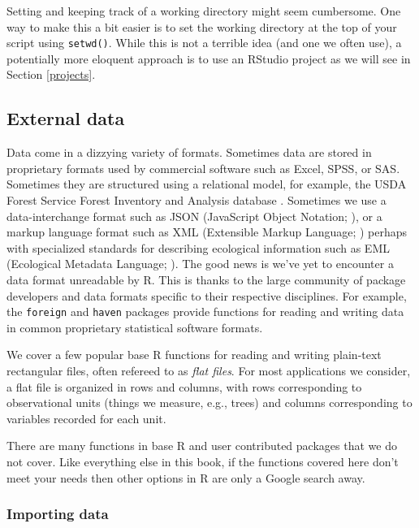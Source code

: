 \documentclass[
  11pt,
]{krantz}
\theoremstyle{definition}
\theoremstyle{definition}
\theoremstyle{definition}
\theoremstyle{definition}
\theoremstyle{remark}
\begin{document}
Setting and keeping track of a working directory might seem cumbersome. One way to make this a bit easier is to set the working directory at the top of your script using \texttt{setwd()}. While this is not a terrible idea (and one we often use), a potentially more eloquent approach is to use an RStudio project as we will see in Section \ref{projects}.

\hypertarget{readWrite}{%
\subsection{External data}\label{readWrite}}

Data come in a dizzying variety of formats. Sometimes data are stored in proprietary formats used by commercial software such as Excel, SPSS, or SAS. Sometimes they are structured using a relational model, for example, the USDA Forest Service Forest Inventory and Analysis database \citep{FIADB}. Sometimes we use a data-interchange format such as JSON (JavaScript Object Notation; \citet{JSON16}), or a markup language format such as XML (Extensible Markup Language; \citet{XML2008}) perhaps with specialized standards for describing ecological information such as EML (Ecological Metadata Language; \citet{EML2019}). The good news is we've yet to encounter a data format unreadable by R. This is thanks to the large community of package developers and data formats specific to their respective disciplines. For example, the \texttt{foreign} \citep{foreign} and \texttt{haven} \citep{haven} packages provide functions for reading and writing data in common proprietary statistical software formats.

We cover a few popular base R functions for reading and writing plain-text rectangular files, often refereed to as \emph{flat files}. For most applications we consider, a flat file is organized in rows and columns, with rows corresponding to observational units (things we measure, e.g., trees) and columns corresponding to variables recorded for each unit.

There are many functions in base R and user contributed packages that we do not cover. Like everything else in this book, if the functions covered here don't meet your needs then other options in R are only a Google search away.

\hypertarget{importing-data}{%
\subsubsection*{Importing data}\label{importing-data}}
\end{document}
